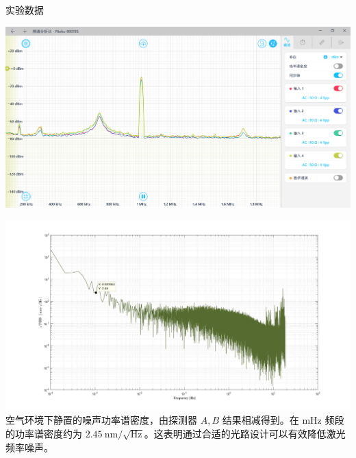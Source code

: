 \documentclass{beamer}
\begin{document}
\begin{frame}{实验数据}
\begin{minipage}{0.5\textwidth}
        \includegraphics[width=\linewidth, height=0.45\textheight, keepaspectratio]{image/6.png}
    \end{minipage}
\end{frame}

\begin{frame}
    \includegraphics[width=\linewidth, height=0.65\textheight]{image/7.jpg}
    空气环境下静置的噪声功率谱密度，由探测器 $A,B$ 结果相减得到。在 $\mathrm{mHz}$ 频段的功率谱密度约为 $2.45~\mathrm{nm}/\sqrt{\mathrm{Hz}}$。这表明通过合适的光路设计可以有效降低激光频率噪声。
\end{frame}
\end{document}
